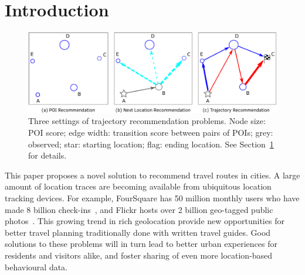 
\secmoveup
\section{Introduction}
\label{sec:intro}

\begin{figure}[t]
	\centering
	\includegraphics[width=\columnwidth]{fig/fig1-flavours.pdf}
	\caption{Three settings of trajectory recommendation problems.
Node size: POI score; edge width: transition score between pairs of POIs;
grey: observed;
star: starting location; flag: ending location. See Section~\ref{sec:intro} for details.
}
	\label{fig:threesettings}\captionmoveup
\end{figure}


This paper proposes a novel solution to recommend travel routes in cities.
A large amount of location traces are becoming available from ubiquitous location tracking devices.
For example, FourSquare
has 50 million monthly users who have made 8 billion check-ins~\cite{4sq},
and Flickr
hosts over 2 billion geo-tagged public photos~\cite{flickr}.
This growing trend in rich geolocation 
provide new opportunities for better
travel planning traditionally done with written travel guides.
Good solutions to these problems will in turn lead to better urban experiences for residents and visitors alike, and foster sharing of even more location-based behavioural data.

